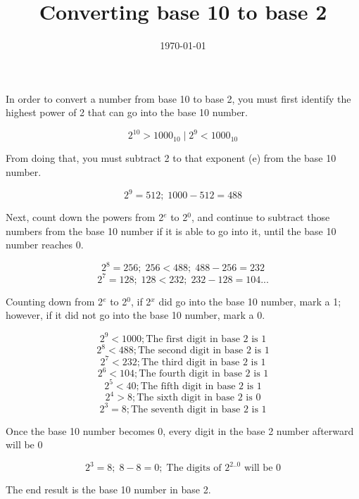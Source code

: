 \documentclass[12pt, letterpaper]{article}
\title{Converting base 10 to base 2}
\date{\today}
\begin{document}
\maketitle

In order to convert a number from base 10 to base 2, you must first identify the highest power of 2 that can go into the base 10 number.

\[ 2^{10} > 1000_{10}\;|\;2^{9} < 1000_{10} \]

From doing that, you must subtract 2 to that exponent (e) from the base 10 number.

\[ 2^{9} = 512;\;1000-512=488  \]

Next, count down the powers from 2$^{e}$ to 2$^{0}$, and continue to subtract those numbers from the base 10 number if it is able to go into it, until the base 10 number reaches 0.

\[ 2^{8} = 256;\; 256 < 488;\; 488-256=232 \]
\[ 2^{7} = 128;\; 128 < 232;\; 232-128=104...  \]

Counting down from 2$^{e}$ to 2$^{0}$, if 2$^{x}$ did go into the base 10 number, mark a 1; however, if it did not go into the base 10 number, mark a 0.

\[ 2^{9} < 1000; \text{The first digit in base 2 is 1}  \]
\[ 2^{8} < 488; \text{The second digit in base 2 is 1}  \]
\[ 2^{7} < 232; \text{The third digit in base 2 is 1}  \]
\[ 2^{6} < 104; \text{The fourth digit in base 2 is 1}  \]
\[ 2^{5} < 40; \text{The fifth digit in base 2 is 1}  \]
\[ 2^{4} > 8; \text{The sixth digit in base 2 is 0}  \]
\[ 2^{3} = 8; \text{The seventh digit in base 2 is 1}  \]

Once the base 10 number becomes 0, every digit in the base 2 number afterward will be 0

\[ 2^{3} = 8;\; 8 - 8 = 0;\; \text{The digits of $2^{2..0}$ will be 0}  \]

The end result is the base 10 number in base 2.
\end{document}
